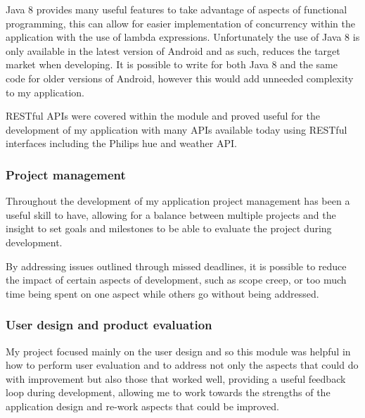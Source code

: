 Java 8 provides many useful features to take advantage of aspects of
functional programming, this can allow for easier implementation of
concurrency within the application with the use of lambda expressions.
Unfortunately the use of Java 8 is only available in the latest version
of Android and as such, reduces the target market when developing. It is
possible to write for both Java 8 and the same code for older versions
of Android, however this would add unneeded complexity to my
application.

RESTful APIs were covered within the module and proved useful for the
development of my application with many APIs available today using
RESTful interfaces including the Philips hue and weather API.

\subsubsection{Project management}\label{project-management}

Throughout the development of my application project management has been
a useful skill to have, allowing for a balance between multiple projects
and the insight to set goals and milestones to be able to evaluate the
project during development.

By addressing issues outlined through missed deadlines, it is possible
to reduce the impact of certain aspects of development, such as scope
creep, or too much time being spent on one aspect while others go
without being addressed.

\subsubsection{User design and product
evaluation}\label{user-design-and-product-evaluation}

My project focused mainly on the user design and so this module was
helpful in how to perform user evaluation and to address not only the
aspects that could do with improvement but also those that worked well,
providing a useful feedback loop during development, allowing me to work
towards the strengths of the application design and re-work aspects that
could be improved.
